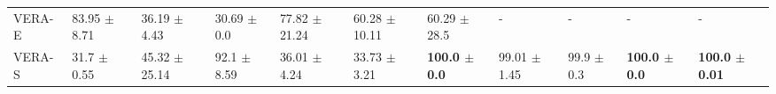 \begin{tabular}{lllllllllll}
VERA-E &             83.95 {\footnotesize $\pm$ 8.71} &            36.19 {\footnotesize $\pm$ 4.43} &             30.69 {\footnotesize $\pm$ 0.0} &            77.82 {\footnotesize $\pm$ 21.24} &           60.28 {\footnotesize $\pm$ 10.11} &            60.29 {\footnotesize $\pm$ 28.5} &                                           - &                                           - &                                           - &                                            - \\
VERA-S &              31.7 {\footnotesize $\pm$ 0.55} &           45.32 {\footnotesize $\pm$ 25.14} &  92.1 {\footnotesize $\pm$ 8.59} &             36.01 {\footnotesize $\pm$ 4.24} &            33.73 {\footnotesize $\pm$ 3.21} &  \bfseries{100.0 {\footnotesize $\pm$ 0.0}} &            99.01 {\footnotesize $\pm$ 1.45} &              99.9 {\footnotesize $\pm$ 0.3} &  \bfseries{100.0 {\footnotesize $\pm$ 0.0}} &  \bfseries{100.0 {\footnotesize $\pm$ 0.01}} \\
\bottomrule
\end{tabular}
